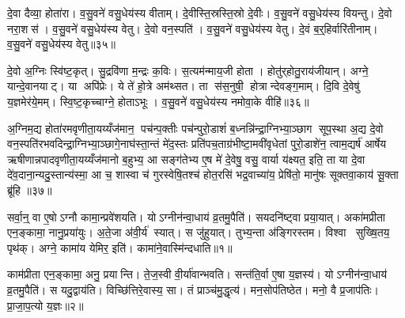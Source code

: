 दे॒वा दैव्या॒ होता॑रा। व॒सु॒वने॑ वसु॒धेय॑स्य वीताम्। दे॒वीस्ति॒स्रस्ति॒स्रो दे॒वीः। व॒सु॒वने॑ वसु॒धेय॑स्य वियन्तु। दे॒वो नरा॒शस॑। व॒सु॒वने॑ वसु॒धेय॑स्य वेतु। दे॒वो वन॒स्पति॑। व॒सु॒वने॑ वसु॒धेय॑स्य वेतु। दे॒वं ब॒र्॒हिर्वारि॑तीनाम्। व॒सु॒वने॑ वसु॒धेय॑स्य वेतु॥३५॥

दे॒वो अ॒ग्निः स्वि॑ष्ट॒कृत्। सु॒द्रवि॑णा म॒न्द्रः क॒विः। स॒त्यम॑न्माय॒जी होता। होतु॑र्‌होतु॒राय॑जीयान्। अग्ने॒ यान्दे॒वानयाट्। या अपि॑प्रेः। ये ते॑ हो॒त्रे अम॑थ्सत। ता स॑स॒नुषी॒ होत्रान्देवङ्ग॒माम्। दि॒वि दे॒वेषु॑ य॒ज्ञमेर॑ये॒मम्। स्वि॒ष्ट॒कृच्चाग्ने॒ होताऽभूः। व॒सु॒वने॑ वसु॒धेय॑स्य नमोवा॒के वीहि॑॥३६॥\anuvakamend[वी॒ता॒व्वेँ॒त्वभू॒रेक॑ञ्च]

अ॒ग्निम॒द्य होता॑रमवृणीता॒यय्यँज॑मान॒ पच॑न्प॒क्तीः पच॑न्पुरो॒डाशं॑ ब॒ध्नन्नि॑न्द्रा॒ग्निभ्या॒ञ्छाग सूप॒स्था अ॒द्य दे॒वो वन॒स्पति॑रभवदिन्द्रा॒ग्निभ्या॒ञ्छागे॒नाघ॑स्ता॒न्तं मे॑द॒स्तः प्रति॑पच॒ताग्र॑भीष्टा॒मवी॑वृधेतां पुरो॒डाशे॑न॒ त्वाम॒द्यर्\mbox{}ष॑ आर्\mbox{}षेय ऋषीणान्नपादवृणीता॒यय्यँज॑मानो ब॒हुभ्य॒ आ सङ्ग॑तेभ्य ए॒ष मे॑ दे॒वेषु॒ वसु॒ वार्या य॑क्ष्यत॒ इति॒ ता या दे॒वा दे॑व॒दाना॒न्यदु॒स्तान्य॑स्मा॒ आ च॒ शास्वा च॑ गुरस्वेषि॒तश्च॑ होत॒रसि॑ भद्र॒वाच्या॑य॒ प्रेषि॑तो॒ मानु॑षः सूक्तवा॒काय॑ सू॒क्ता ब्रू॑हि ॥३७॥\anuvakamend[अ॒ग्निम॒द्यैकम्]





\clearpage
{}
\setcounter{anuvakam}{0}
सर्वा॒न्॒ वा ए॒षोऽग्नौ कामा॒न्प्रवे॑शयति। योऽग्नीन॑न्वा॒धाय॑ व्र॒तमु॒पैति॑। सयदनि॑ष्ट्वा प्रया॒यात्। अका॑मप्रीता एन॒ङ्कामा॒ नानु॒प्रया॑युः। अ॒ते॒जा अ॑वी॒र्य॑ स्यात्। स जु॑हुयात्। तुभ्य॒न्ता अ॑ङ्गिरस्तम। विश्वा सुख्षि॒तय॒ पृथ॑क्। अग्ने॒ कामा॑य येमिर॒ इति॑। कामा॑ने॒वास्मि॑न्दधाति॥१॥

काम॑प्रीता एन॒ङ्कामा॒ अनु॒ प्रयान्ति। ते॒ज॒स्वी वी॒र्या॑वान्भवति। सन्त॑ति॒र्वा ए॒षा य॒ज्ञस्य॑। योऽग्नीन॑न्वा॒धाय॑ व्र॒तमु॒पैति॑। स यदु॒द्वाय॑ति। विच्छि॑त्तिरे॒वास्य॒ सा। तं प्राञ्च॑मु॒द्धृत्य॑। मन॒सोप॑तिष्ठेत। मनो॒ वै प्र॒जाप॑तिः। प्रा॒जा॒प॒त्यो य॒ज्ञः॥२॥

